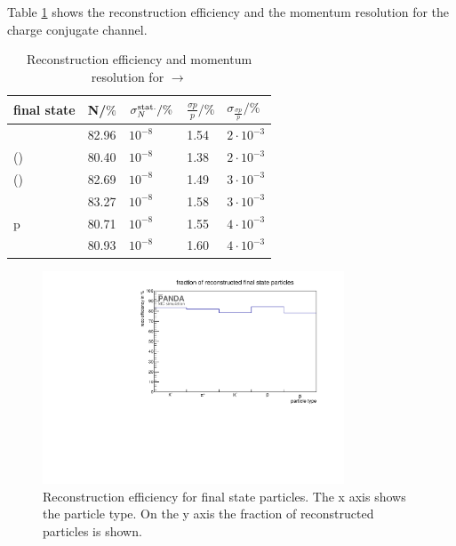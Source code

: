 	Table \ref{tab:finalstate_recoeff_cc} shows the reconstruction efficiency and the momentum resolution for the charge conjugate channel.
	
	\begin{table}
		\centering
		\caption{\propose Reconstruction efficiency and momentum resolution for \pbarpSystem $\rightarrow$ \excitedanticascade \cascade}
		\label{tab:finalstate_recoeff_cc}
		\begin{tabular}{lllll}
			\hline
			final state & N/$\%$ & $\sigma_N^{\textnormal{stat.}}/\%$ &$\frac{\sigma p}{p}/\%$ & $\sigma_\frac{\sigma p}{p}/\%$ \\
			\hline
			\hline
			\piplus &  82.96& $10^{-8}$&  1.54 & $2\cdot 10^{-3}$\\
			\piminusone(\cascade) & 80.40& $10^{-8}$&   1.38 & $2\cdot 10^{-3}$  \\
			\piminustwo(\lam) &  82.69&  $10^{-8}$& 1.49& $3\cdot 10^{-3}$\\
			\kplus& 83.27& $10^{-8}$&  1.58 & $3\cdot 10^{-3}$\\
			p &  80.71& $10^{-8}$&  1.55& $4\cdot 10^{-3}$\\
			\antiproton &  80.93& $10^{-8}$&  1.60 & $4\cdot 10^{-3}$\\\hline
			 
		\end{tabular}
	\end{table}
	
	\begin{figure}
	
		\centering
		\includegraphics[width=0.8\textwidth]{./plots/finalstate/reco_efficiency.pdf}
		\caption{\propose Reconstruction efficiency for final state particles. The x axis shows the particle type. 
				On the y axis the fraction of reconstructed particles is shown.}
		\label{fig:finalstate_recoeff}
	
	\end{figure}
	

